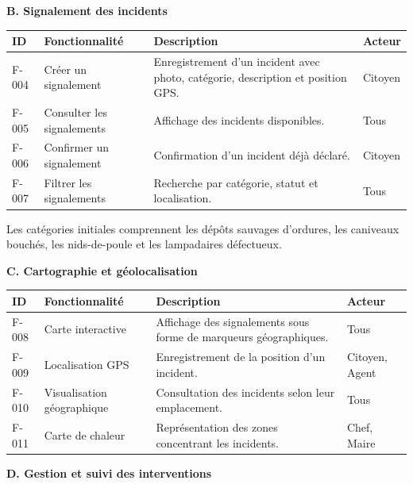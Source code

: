 \documentclass[11pt,a4paper,oneside]{report}
\begin{document}
	\noindent\textbf{B. Signalement des incidents}
	
	\begin{center}
		\begin{tabular}{|p{1.1cm}|p{3cm}|p{8cm}|p{1.7cm}|}
			\hline
			\textbf{ID} & \textbf{Fonctionnalité} &
			\textbf{Description} & \textbf{Acteur} \\ \hline
			F-004 & Créer un signalement & Enregistrement d'un incident avec photo, catégorie, description et position GPS. & Citoyen \\ \hline
			F-005 & Consulter les signalements & Affichage des incidents disponibles. & Tous \\ \hline
			F-006 & Confirmer un signalement & Confirmation d'un incident déjà déclaré. & Citoyen \\ \hline
			F-007 & Filtrer les signalements & Recherche par catégorie, statut et localisation. & Tous \\ \hline
		\end{tabular}
	\end{center}
	
	Les catégories initiales comprennent les dépôts
	sauvages d'ordures, les caniveaux bouchés, les
	nids-de-poule et les lampadaires défectueux.
	
	\noindent\textbf{C. Cartographie et géolocalisation}
	
	\begin{center}
		\begin{tabular}{|p{1.1cm}|p{3cm}|p{8cm}|p{1.7cm}|}
			\hline
			\textbf{ID} & \textbf{Fonctionnalité} &
			\textbf{Description} & \textbf{Acteur} \\ \hline
			F-008 & Carte interactive & Affichage des signalements sous forme de marqueurs géographiques. & Tous \\ \hline
			F-009 & Localisation GPS & Enregistrement de la position d'un incident. & Citoyen, Agent \\ \hline
			F-010 & Visualisation géographique & Consultation des incidents selon leur emplacement. & Tous \\ \hline
			F-011 & Carte de chaleur & Représentation des zones concentrant les incidents. & Chef, Maire \\ \hline
		\end{tabular}
	\end{center}
	
	\noindent\textbf{D. Gestion et suivi des interventions}
	
\end{document}
